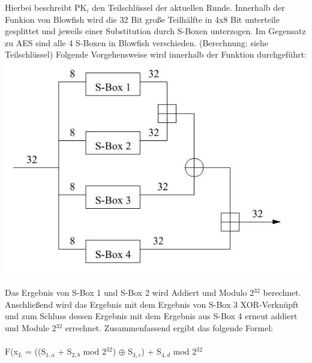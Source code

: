 \documentclass[10pt, a4paper,headsepline]{scrreprt}
\begin{document}
\begin{minipage}[t]{10cm}

Hierbei beschreibt PK$_{i}$ den Teilschlüssel der aktuellen Runde. Innerhalb der Funkion von Blowfish wird die 32 Bit große Teilhälfte in 4x8 Bit unterteile gesplittet und jeweils einer Substitution durch S-Boxen unterzogen. Im Gegensatz zu AES sind alle 4 S-Boxen in Blowfish verschieden. (Berechnung: siehe Teilschlüssel) Folgende Vorgehensweise wird innerhalb der Funktion durchgeführt: \\ 
\includegraphics[scale=0.25]{blowfish_2.JPG} 
\label{fig:Funktion Blowfish} 
\hfill

Das Ergebnis von S-Box 1 und S-Box 2 wird Addiert und Modulo 2$^{32}$ berechnet. Anschließend wird das Ergebnis mit dem Ergebnis von S-Box 3 XOR-Verknüpft und zum Schluss dessen Ergebnis mit dem Ergebnis aus S-Box 4 erneut addiert und Module 2$^{32}$ errechnet. Zusammenfassend ergibt das folgende Formel: \\ \\
F(x$_{L}$ = ((S$_{1,a}$ + S$_{2,b}$ mod 2$^{32}$) $\oplus$ S$_{3,c}$) + S$_{4,d}$ mod 2$^{32}$ \\ \\
\end{minipage}
\end{document}
